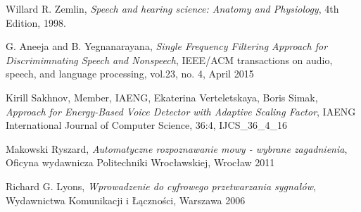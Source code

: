 \documentclass[eng,printmode]{mgr}
\begin{document}
\begin{thebibliography}{9}
	
	Willard R. Zemlin,
	\textit{Speech and hearing science: Anatomy and Physiology},
	4th Edition,
	1998.
	
	G. Aneeja and B. Yegnanarayana, \textit{Single Frequency Filtering Approach for Discrimimnating Speech and Nonspeech},
	IEEE/ACM transactions on audio, speech, and language processing, vol.23, 
	no. 4,
	April 2015 

	Kirill Sakhnov, 
	Member, 
	IAENG,
	Ekaterina Verteletskaya, 
	Boris Simak, 
	\textit{Approach for Energy-Based Voice Detector with Adaptive Scaling Factor},
	IAENG International Journal of Computer Science, 
	36:4, 
	IJCS\_36\_4\_16
	
	Makowski Ryszard,
	\textit{Automatyczne rozpoznawanie mowy - wybrane zagadnienia},
	Oficyna wydawnicza Politechniki Wrocławskiej,
	Wrocław 2011
	
	Richard G. Lyons,
	\textit{Wprowadzenie do cyfrowego przetwarzania sygnałów},
	Wydawnictwa Komunikacji i Łączności,
	Warszawa 2006
	
	
\end{thebibliography}
%


 \listoffigures
 \listoftables
\end{document}
